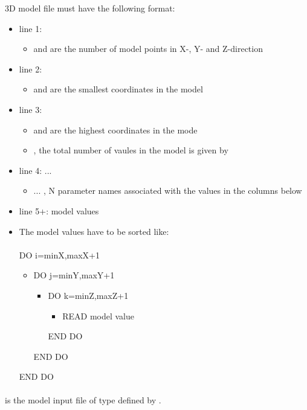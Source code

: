 3D model file must have the following format:
\begin{itemize}
\item[]line 1:   
\begin{itemize}
\item[] and  are the number of model points in X-, Y- and Z-direction
\end{itemize}
\item[]line 2:   
\begin{itemize}
\item[] and  are the smallest coordinates in the model
\end{itemize}
\item[]line 3:   
\begin{itemize}
\item[] and  are the highest coordinates in the mode
\item[], the total number of vaules in the model is given by 
\end{itemize}
\item[]line 4:    ... 
\begin{itemize}
\item[] ... , N parameter names associated with the values in the columns below
\end{itemize} 
\item[]line 5+:   model values
\item[]The model values have to be sorted like:\\
\\
DO i=minX,maxX+1
\begin{itemize}
\item[]DO j=minY,maxY+1
\begin{itemize}
\item[]DO k=minZ,maxZ+1
\begin{itemize}
\item[]READ model value
\end{itemize}
END DO
\end{itemize}
END DO
\end{itemize}
END DO
\end{itemize}
\paragraph{}
 is the model input file of type defined by .
